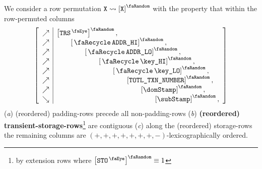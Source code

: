 We consider a row permutation $\col{X}\rightsquigarrow\order{\col{X}}$ with the property that within the row-permuted columns
\[
	\left[ \begin{array}{c|l}
		\nearrow   & \order{\peekTransient}, \\
		\nearrow   & \quad\quad \order{\transAddressHi}, \\
		\nearrow   & \quad\quad \quad\quad \order{\transAddressLo}, \\
		\nearrow   & \quad\quad \quad\quad \quad\quad \order{\transKeyHi}, \\
		\nearrow   & \quad\quad \quad\quad \quad\quad \quad\quad \order{\transKeyLo}, \\
		\nearrow   & \quad\quad \quad\quad \quad\quad \quad\quad \quad\quad \order{\totalTransactionNumber}, \\
		\nearrow   & \quad\quad \quad\quad \quad\quad \quad\quad \quad\quad \quad\quad \order{\domStamp}, \\
		\searrow & \quad\quad \quad\quad \quad\quad \quad\quad \quad\quad \quad\quad \quad\quad \order{\subStamp}, \\
	\end{array} \right]
\]
\noindent
(\emph{a}) (reordered) padding-rows precede all non-padding-rows
(\emph{b}) \textbf{(reordered) transient-storage-rows}\footnote{by extension rows where $\order{\peekStorage} \equiv 1$} are contiguous
(\emph{c}) along the (reordered) storage-rows the remaining columns are $(+, +, +, +, +, +, +, -)$-lexicographically ordered.
